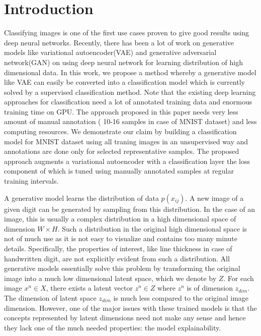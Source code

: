 \documentclass{uai2021} %
\begin{document}
\section{Introduction}\label{sec:intro}
Classifying images is one of the first use cases proven to give good results using deep neural networks.
Recently, there has been a lot of work on generative models like variational autoencoder(VAE)\cite{kingma2013auto} and generative adversarial network(GAN) \cite{goodfellow2014generative} on using deep neural network for learning distribution of high dimensional data.
In this work, we propose a method whereby a generative model like VAE can easily be converted into a classification model which is currently solved by a supervised classification method.
Note that the existing deep learning approaches for classification  need a lot of annotated training data and enormous training time on GPU\cite{krizhevsky2012imagenet}\cite{simonyan2014very}\cite{he2016deep}.
The approach proposed in this paper needs very less amount of manual annotation ( 10-16 samples in case of MNIST dataset)  and less computing resources.
We demonstrate our claim by building a classification model for MNIST dataset using all traning images in an unsupervised way and annotations are done only for selected representative samples.
The proposed approach augments a  variational autoencoder with a classification layer the loss component of which is tuned using manually annotated samples at regular training intervals.


A generative model learns the distribution of data $p(x_{ij})$.
A new image of a given digit can be generated by sampling from this distribution.
In the case of an image, this is usually a complex distribution in a high dimensional space of dimension $W \times H$.
Such a distribution in the original high dimensional space is not of much use as it is not easy to visualize and contains too many  minute details.
Specifically, the properties of interest, like line thickness in case of handwritten digit, are not explicitly evident from such a distribution.
All generative models essentially solve this problem by transforming the original image into a much low dimensional latent space, which we denote by  $Z$.
For each image $x^n \in X$, there exists a latent vector  $z^n \in Z$  where $z^n$ is of dimension $z_{dim}$.
The dimension of latent space $z_{dim}$ is much less compared to the original image dimension.
However, one of the major issues with these trained models is that the concepts represented by latent dimensions need not make any sense and hence they lack one of the much needed properties: the model explainability.
\end{document}
